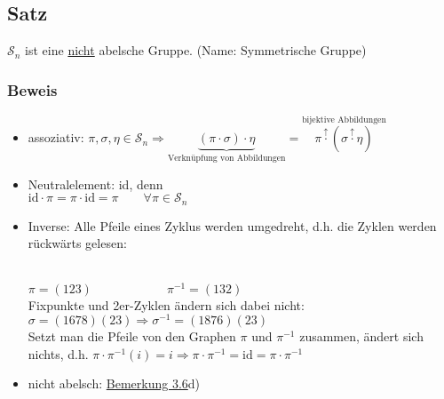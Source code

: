 \documentclass[12pt,titlepage, pdf]{article}
\newcommand{\uline}[1]{\underline{#1}}
\newcommand{\id}{\textrm{id}}
\renewcommand{\>}{\rightarrow}
\renewcommand{\*}{\cdot}
\begin{document}
\subsection{Satz}
\label{3.11}
$\mathscr{S}_n$ ist eine \uline{nicht} abelsche Gruppe. (Name: Symmetrische Gruppe) \\
\subsubsection*{Beweis}
\begin{itemize}
	\item assoziativ: $\pi, \sigma, \eta \in \mathscr{S}_n \Rightarrow \underbrace{(\pi \cdot \sigma) \cdot \eta}_{\textrm{Verknüpfung von Abbildungen}} = \overset{\textrm{bijektive Abbildungen}}{\pi \overset{\uparrow}{\cdot} (\sigma \overset{\uparrow}{\cdot} \eta)}$
	\item Neutralelement: id, denn \\
	$\id \cdot \pi = \pi \cdot \id = \pi\qquad\forall\pi\in\mathscr{S}_n$
	\item Inverse: Alle Pfeile eines Zyklus werden umgedreht, d.h. die Zyklen werden rückwärts gelesen:\\
	\\
	$\pi=(123)\qquad\qquad\qquad\pi^{-1}=(132)$\\
Fixpunkte und 2er-Zyklen ändern sich dabei nicht:\\
$\sigma = (1678)(23)\Rightarrow\sigma^{-1} = (1876)(23)$\\
Setzt man die Pfeile von den Graphen $\pi$ und $\pi^{-1}$ zusammen, ändert sich nichts, d.h. $\pi \cdot  \pi^{-1}(i) = i \Rightarrow \pi \cdot  \pi^{-1} = \id = \pi \cdot  \pi^{-1}$
\item nicht abelsch: \hyperref[3.6]{Bemerkung 3.6}d)
\end{itemize}\newpage
{}
\end{document}
